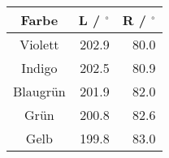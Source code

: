 \begin{tabular}{c|rr}
Farbe & L / ${}^\circ$ & R / ${}^\circ$ \\
\hline
Violett & 202.9 & 80.0\\
Indigo & 202.5 & 80.9\\
Blaugrün & 201.9 & 82.0\\
Grün & 200.8 & 82.6\\
Gelb & 199.8 & 83.0
\end{tabular}